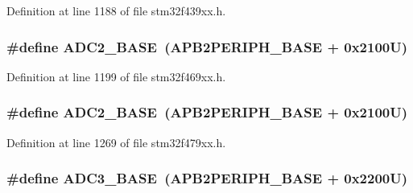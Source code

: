 Definition at line 1188 of file stm32f439xx.\+h.

\subsubsection[{\texorpdfstring{A\+D\+C2\+\_\+\+B\+A\+SE}{ADC2_BASE}}]{\setlength{\rightskip}{0pt plus 5cm}\#define A\+D\+C2\+\_\+\+B\+A\+SE~({\bf A\+P\+B2\+P\+E\+R\+I\+P\+H\+\_\+\+B\+A\+SE} + 0x2100\+U)}\hypertarget{group___peripheral__memory__map_ga6544abc57f9759f610eee09a02442ae6}{}\label{group___peripheral__memory__map_ga6544abc57f9759f610eee09a02442ae6}


Definition at line 1199 of file stm32f469xx.\+h.

\subsubsection[{\texorpdfstring{A\+D\+C2\+\_\+\+B\+A\+SE}{ADC2_BASE}}]{\setlength{\rightskip}{0pt plus 5cm}\#define A\+D\+C2\+\_\+\+B\+A\+SE~({\bf A\+P\+B2\+P\+E\+R\+I\+P\+H\+\_\+\+B\+A\+SE} + 0x2100\+U)}\hypertarget{group___peripheral__memory__map_ga6544abc57f9759f610eee09a02442ae6}{}\label{group___peripheral__memory__map_ga6544abc57f9759f610eee09a02442ae6}


Definition at line 1269 of file stm32f479xx.\+h.

\subsubsection[{\texorpdfstring{A\+D\+C3\+\_\+\+B\+A\+SE}{ADC3_BASE}}]{\setlength{\rightskip}{0pt plus 5cm}\#define A\+D\+C3\+\_\+\+B\+A\+SE~({\bf A\+P\+B2\+P\+E\+R\+I\+P\+H\+\_\+\+B\+A\+SE} + 0x2200\+U)}\hypertarget{group___peripheral__memory__map_gaca766f86c8e0b00a8e2b0224dcbb4c82}{}\label{group___peripheral__memory__map_gaca766f86c8e0b00a8e2b0224dcbb4c82}


